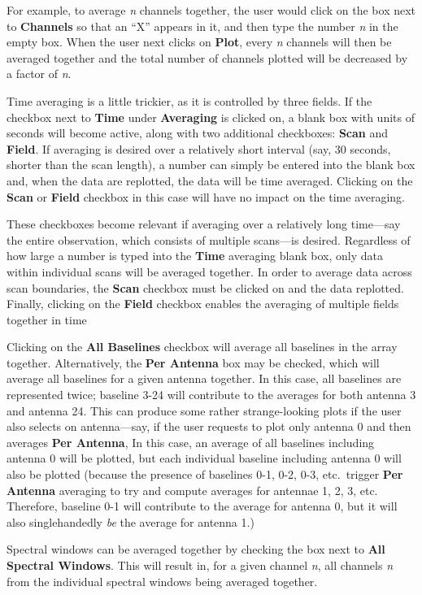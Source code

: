 For example, to average {\it n} channels together, the user would click on the box next to {\bf Channels} so that an ``X'' appears in it, and then type the number {\it n} in the empty box. When the user next clicks on {\bf Plot}, every {\it n} channels will then be averaged together and the total number of channels plotted will be decreased by a factor of {\it n}.

Time averaging is a little trickier, as it is controlled by three fields. If the checkbox next to {\bf Time} under {\bf Averaging} is clicked on, a blank box with units of seconds will become active, along with two additional checkboxes: {\bf Scan} and {\bf Field}. If averaging is desired over a relatively short interval (say, 30 seconds, shorter than the scan length), a number can simply be entered into the blank box and, when the data are replotted, the data will be time averaged. Clicking on the {\bf Scan} or {\bf Field} checkbox in this case will have no impact on the time averaging.

These checkboxes become relevant if averaging over a relatively long time---say the entire observation, which consists of multiple scans---is desired. Regardless of how large a number is typed into the {\bf Time} averaging blank box, only data within individual scans will be averaged together. In order to average data across scan boundaries, the {\bf Scan} checkbox must be clicked on and the data replotted. Finally, clicking on the {\bf Field} checkbox enables the averaging of multiple fields together in time

Clicking on the {\bf All Baselines} checkbox will average all baselines in the array together. Alternatively, the {\bf Per Antenna} box  may be checked, which will average all baselines for a given antenna together. In this case, all baselines are represented twice; baseline 3-24 will contribute to the averages for both antenna 3 and antenna 24. This can produce some rather strange-looking plots if the user also selects on antenna---say, if the user requests to plot only antenna 0 and then averages {\bf Per Antenna}, In this case, an average of all baselines including antenna 0 will be plotted, but each individual baseline including antenna 0 will also be plotted (because the presence of baselines 0-1, 0-2, 0-3, etc.~trigger {\bf Per Antenna} averaging to try and compute averages for antennae 1, 2, 3, etc. Therefore, baseline 0-1 will contribute to the average for antenna 0, but it will also singlehandedly {\it be} the average for antenna 1.) 

Spectral windows can be averaged together by checking the box next to {\bf All Spectral Windows}. This will result in, for a given channel {\it n}, all channels {\it n} from the individual spectral windows being averaged together. 


